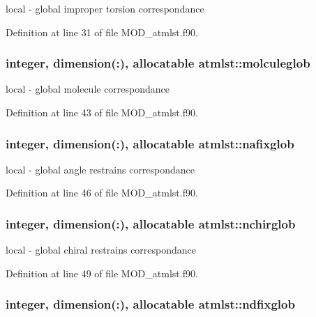 local -\/ global improper torsion correspondance 



Definition at line 31 of file M\-O\-D\-\_\-atmlst.\-f90.

\hypertarget{classatmlst_ad62b00f425a04aeb43f31558243bf87b}{
\subsubsection[{molculeglob}]{\setlength{\rightskip}{0pt plus 5cm}integer, dimension(\-:), allocatable atmlst\-::molculeglob}}\label{classatmlst_ad62b00f425a04aeb43f31558243bf87b}


local -\/ global molecule correspondance 



Definition at line 43 of file M\-O\-D\-\_\-atmlst.\-f90.

\hypertarget{classatmlst_a6f1fe2ddf10ff4af2dac1d47f65f66e0}{
\subsubsection[{nafixglob}]{\setlength{\rightskip}{0pt plus 5cm}integer, dimension(\-:), allocatable atmlst\-::nafixglob}}\label{classatmlst_a6f1fe2ddf10ff4af2dac1d47f65f66e0}


local -\/ global angle restrains correspondance 



Definition at line 46 of file M\-O\-D\-\_\-atmlst.\-f90.

\hypertarget{classatmlst_a8fea084e4438f63e3205464b04ffd146}{
\subsubsection[{nchirglob}]{\setlength{\rightskip}{0pt plus 5cm}integer, dimension(\-:), allocatable atmlst\-::nchirglob}}\label{classatmlst_a8fea084e4438f63e3205464b04ffd146}


local -\/ global chiral restrains correspondance 



Definition at line 49 of file M\-O\-D\-\_\-atmlst.\-f90.

\hypertarget{classatmlst_a935be70be3408495e70f3e1e8cf16469}{
\subsubsection[{ndfixglob}]{\setlength{\rightskip}{0pt plus 5cm}integer, dimension(\-:), allocatable atmlst\-::ndfixglob}}\label{classatmlst_a935be70be3408495e70f3e1e8cf16469}


